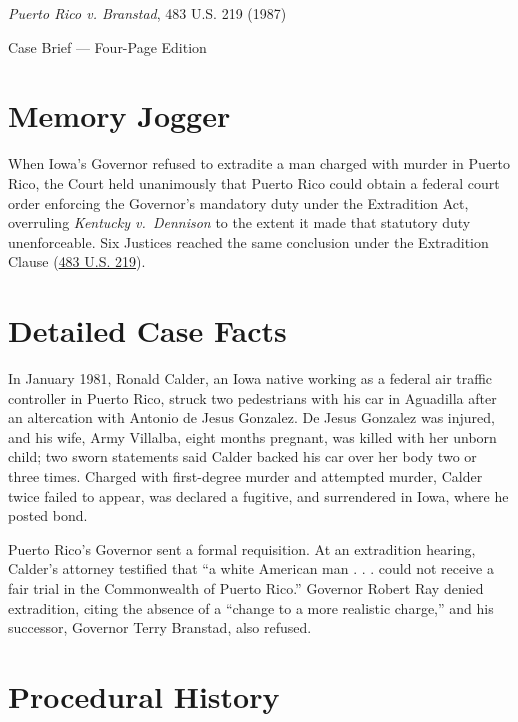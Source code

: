 \documentclass[12pt]{article}
\begin{document}
\begin{center}
{\LARGE \textit{Puerto Rico v. Branstad}, 483 U.S. 219 (1987)\par}
\vspace{0.8em}
{\large Case Brief --- Four-Page Edition\par}
\end{center}
\vspace{1em}

\section{Memory Jogger}

When Iowa's Governor refused to extradite a man charged with murder in Puerto Rico, the Court held unanimously that Puerto Rico could obtain a federal court order enforcing the Governor's mandatory duty under the Extradition Act, overruling \textit{Kentucky v.\ Dennison} to the extent it made that statutory duty unenforceable. Six Justices reached the same conclusion under the Extradition Clause (\href{https://supreme.justia.com/cases/federal/us/483/219/}{483 U.S. 219}).

\section{Detailed Case Facts}

In January 1981, Ronald Calder, an Iowa native working as a federal air traffic controller in Puerto Rico, struck two pedestrians with his car in Aguadilla after an altercation with Antonio de Jesus Gonzalez. De Jesus Gonzalez was injured, and his wife, Army Villalba, eight months pregnant, was killed with her unborn child; two sworn statements said Calder backed his car over her body two or three times. Charged with first-degree murder and attempted murder, Calder twice failed to appear, was declared a fugitive, and surrendered in Iowa, where he posted bond.

Puerto Rico's Governor sent a formal requisition. At an extradition hearing, Calder's attorney testified that ``a white American man . . . could not receive a fair trial in the Commonwealth of Puerto Rico.'' Governor Robert Ray denied extradition, citing the absence of a ``change to a more realistic charge,'' and his successor, Governor Terry Branstad, also refused.

\section{Procedural History}
\end{document}
